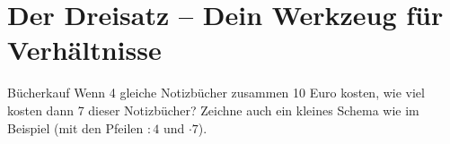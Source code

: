
\section{Der Dreisatz – Dein Werkzeug für Verhältnisse}
\label{sec:dreisatz_ueberarbeitet}


\begin{aufgabenumgebung}[aufg:X.Y]{Bücherkauf} %
Wenn 4 gleiche Notizbücher zusammen 10 Euro kosten, wie viel kosten dann 7 dieser Notizbücher?
Zeichne auch ein kleines Schema wie im Beispiel (mit den Pfeilen $:4$ und $\cdot7$).
\end{aufgabenumgebung}

